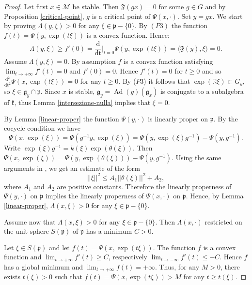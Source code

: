 \documentclass[leqno,11pt, a4]{amsart}
\theoremstyle{named}
\begin{document}
\begin{proof}
 Let first $x\in {\mathscr{M}}$ be stable. Then ${\mathfrak{F}}(g x) =0$ for some $g\in G$ and by Proposition \ref{critical-point}, $g$ is a critical point of
  $\Psi(x, {\cdot})$. Set $y=g x$. We start by proving
  ${\Lambda} (y, \xi) >0$ for any $\xi \in {\mathfrak{p}}{-}\{0\}$.  By $(P3)$ the function
  $f(t)=\Psi(y, \exp(t\xi))$ is a convex function. Hence:
  \begin{gather*}
    {\Lambda}(y,\xi) \geq f'(0)={{\dfrac {\mathrm {d}  }{\mathrm {dt}}} \vert _{t=0} } \Psi(y, \exp( t\xi ) )= {\langle} {\mathfrak{F}}
    (y), \xi {\rangle}=0.
  \end{gather*}
  Assume ${\Lambda} (y, \xi )=0$.  By assumption $f$ is a convex function satisfying $\lim_{t\to +\infty} f'(t)= 0$ and $f'(0)=0$. Hence $f'(t)=0$ for $t\geq 0$ and so
  $\frac{\mathrm{d^2}}{\mathrm{dt}^2 } \Psi(x,\exp(t \xi ))=0$ for any
  $t\geq 0$. By ($P3$) it follows that
  $\exp({\mathbb{R}} \xi ) \subset G_y$, so $\xi \in {\mathfrak{g}}_y\cap {\mathfrak{p}}$.  Since
  $x$ is stable, $\mathfrak g_y = {\operatorname{Ad}}(g) ({\mathfrak{g}}_x)$ is conjugate to a
  subalgebra of ${\mathfrak{k}}$, thus Lemma \ref {intersezione-nulla} implies
  that $\xi =0$.

  By Lemma \ref{linear-proper} the function $\Psi(y,\cdot)$ is linearly proper on ${\mathfrak{p}}$. By the cocycle condition we have
  \[
  \Psi(x,\exp(\xi))=\Psi(g^{-1}y,\exp(\xi))=\Psi(y,\exp(\xi)g^{-1})-\Psi(y,g^{-1}).
  \]
Write $\exp(\xi)g^{-1}=k(\xi )\exp(\theta(\xi))$. Then $\Psi(x,\exp(\xi))=\Psi(y,\exp (\theta (\xi)))-\Psi(y,g^{-1})$.
Using the same arguments in  \cite{mundet-Crelles}, we get  an estimate of the form
  \[
  || \xi ||^2 \leq A_1 || \theta(\xi) ||^2 + A_2,
  \]
  where $A_1$ and $A_2$ are positive constants. Therefore the linearly properness of $\Psi(y,\cdot)$ on ${\mathfrak{p}}$ implies the linearly properness of $\Psi(x,\cdot)$ on ${\mathfrak{p}}$. Hence, by Lemma \ref{linear-proper},
  $\Lambda(x,\xi)>0$ for any $\xi\in {\mathfrak{p}}{-}\{0\}$.

Assume now that $\Lambda (x,\xi) > 0$ for any $\xi\in {\mathfrak{p}}{-}\{0\}$. Then $\Lambda(x,\cdot)$ restricted on the unit sphere $S({\mathfrak{p}})$ of ${\mathfrak{p}}$ has  a minimum $C>0$.

Let $\xi \in S({\mathfrak{p}})$ and let $f(t)= \Psi(x,\exp(t \xi))$. The function $f$  is a convex function and  $\lim_{t\to + \infty} f'(t)\geq C$, respectively $\lim_{t\to - \infty} f'(t)\leq -C$. Hence $f$ has a global minimum and
$\lim_{t\to + \infty} f(t)=+\infty$. Thus, for any $M>0$, there exists  $t(\xi )>0$ such that  $f(t)=\Psi(x,\exp(t \xi))> M$ for any $t\geq t(\xi)$.


\end{proof}
\end{document}
